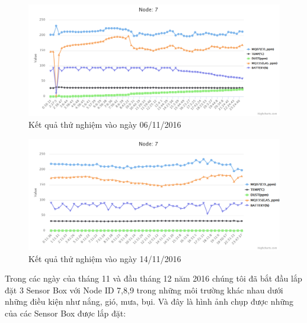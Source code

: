 \begin{figure}[H]
	\centering    
	\includegraphics[width=6in]{6nov}
	\caption[Kết quả thử nghiệm vào ngày 06/11/2016]{Kết quả thử nghiệm vào ngày 06/11/2016}
	\label{fig:6nov}
\end{figure}

\begin{figure}[H]
	\centering    
	\includegraphics[width=6in]{14nov}
	\caption[Kết quả thử nghiệm vào ngày 14/11/2016]{Kết quả thử nghiệm vào ngày 14/11/2016}
	\label{fig:14nov}
\end{figure}



Trong các ngày của tháng 11 và đầu tháng 12 năm 2016 chúng tôi đã bắt đầu lắp đặt 3 Sensor Box với Node ID 7,8,9 trong những môi trường khác nhau dưới những điều kiện như nắng, gió, mưa, bụi. Và đây là hình ảnh chụp được những của các Sensor Box được lắp đặt:

